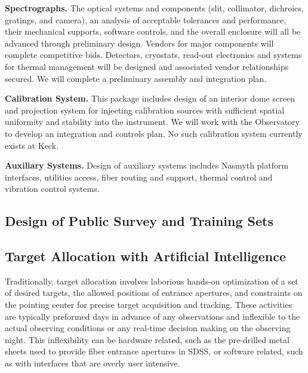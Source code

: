 \documentclass[oneside,11pt]{amsart}
\newcommand{\comment}[2][todo]{{\color{#1}[[{\bf #2}]]}}
\begin{document}
\noindent \textbf{Spectrographs.} The optical systems and components (slit, collimator, dichroics, gratings, and camera), an analysis of acceptable tolerances and performance, their mechanical supports, software controls, and the overall enclosure will all be advanced through preliminary design.  Vendors for major components will complete competitive bids.  Detectors, cryostats, read-out electronics and systems for thermal management will be designed and associated vendor relationships secured. We will complete a preliminary assembly and integration plan.

\noindent \textbf{Calibration System.} This package includes design of an interior dome screen and projection system for injecting calibration sources with sufficient spatial uniformity and stability into the instrument.  We will work with the Observatory to develop an integration and controls plan.  No such calibration system currently exists at Keck.

\noindent \textbf{Auxiliary Systems.} Design of auxiliary systems includes Nasmyth platform interfaces, utilities access, fiber routing and support, thermal control and vibration control systems.


\subsection{Design of Public Survey and Training Sets}
\label{sec:survey}
\noindent \comment{1 page}



\subsection{Target Allocation with Artificial Intelligence}
\label{sec:targeting}
\noindent \comment{1/2 page}

Traditionally, target allocation involves laborious hands-on
optimization of a set of desired targets, the allowed positions of
entrance apertures, and constraints on the pointing center for precise
target acquisition and tracking.  These activities are typically
preformed days in advance of any observations and inflexible to the
actual observing conditions or any real-time decision making on the
observing night.  This inflexibility can be hardware related, such as
the pre-drilled metal sheets used to provide fiber entrance apertures in
SDSS, or software related, such as with interfaces that are overly user
intensive.
\end{document}
